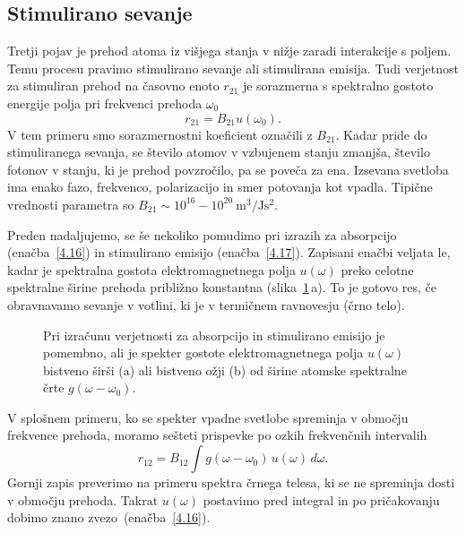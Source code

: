 \subsection*{Stimulirano sevanje}
Tretji pojav je prehod atoma iz višjega stanja v nižje zaradi interakcije
s poljem. Temu procesu pravimo stimulirano sevanje ali 
stimulirana emisija. Tudi verjetnost za stimuliran prehod na časovno enoto $r_{21}$ 
je sorazmerna s spektralno gostoto energije polja pri frekvenci prehoda $\omega_{0}$
\begin{equation}
r_{21}=B_{21}u(\omega_{0}).
\label{4.17}
\end{equation}
V tem primeru smo sorazmernostni koeficient označili z $B_{21}$. Kadar pride do
stimuliranega sevanja, se število atomov v vzbujenem stanju zmanjša, 
število fotonov v stanju, ki je prehod povzročilo, pa se poveča za ena. 
Izsevana svetloba ima enako fazo, frekvenco, polarizacijo in smer potovanja kot 
vpadla. Tipične vrednosti parametra so $B_{21} \sim 10^{16}-10^{20}~\si{\metre^3/\joule\second^2}	$.

Preden nadaljujemo, se še nekoliko pomudimo pri izrazih za absorpcijo
(enačba~\ref{4.16}) in stimulirano emisijo (enačba~\ref{4.17}).
Zapisani enačbi
veljata le, kadar je spektralna gostota 
elektromagnetnega polja $u(\omega)$
preko celotne spektralne širine prehoda približno konstantna 
(slika~\ref{fig:spektri}\,a). To je gotovo res, če
obravnavamo sevanje v votlini, ki je v termičnem ravnovesju (črno telo). 

\begin{figure}
\centering
\def\svgwidth{120truemm} 

\caption{Pri izračunu verjetnosti za absorpcijo in stimulirano emisijo je 
pomembno, ali je spekter gostote elektromagnetnega polja $u(\omega)$ bistveno širši
(a) ali bistveno ožji (b) od širine atomske spektralne črte $g(\omega-\omega_0)$.}
\label{fig:spektri}
\end{figure}

V splošnem primeru, ko se spekter vpadne svetlobe spreminja v območju 
frekvence prehoda, moramo sešteti prispevke po ozkih frekvenčnih intervalih
\begin{equation}
r_{12}=B_{12}\int g(\omega-\omega_0)\, u(\omega)\, d\omega.
\label{4.19}
\end{equation}
Gornji zapis preverimo na primeru spektra črnega telesa, ki se ne spreminja 
dosti v območju prehoda. Takrat $u(\omega)$ postavimo pred integral in po pričakovanju
dobimo znano zvezo~(enačba~\ref{4.16}). 

